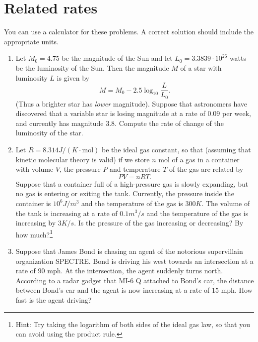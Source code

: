 \documentclass[reqno,12pt,letterpaper]{amsart}
\theoremstyle{definition}
\numberwithin{equation}{section}
\begin{document}
\section{Related rates}
You can use a calculator for these problems.
A correct solution should include the appropriate units.

\begin{enumerate}
\item Let $M_0 = 4.75$ be the magnitude of the Sun and let $L_0 = 3.3839 \cdot 10^{26}$ watts be the luminosity of the Sun.
Then the magnitude $M$ of a star with luminosity $L$ is given by
$$M = M_0 - 2.5 \log_{10} \frac{L}{L_0}.$$
(Thus a brighter star has \emph{lower} magnitude).
Suppose that astronomers have discovered that a variable star is losing magnitude at a rate of $0.09$ per week, and currently has magnitude $3.8$.
Compute the rate of change of the luminosity of the star.
\item Let $R = 8.314 J/(K\cdot \text{mol})$ be the ideal gas constant, so that (assuming that kinetic molecular theory is valid) if we store $n$ mol of a gas in a container with volume $V$, the pressure $P$ and temperature $T$ of the gas are related by
$$PV = nRT.$$
Suppose that a container full of a high-pressure gas is slowly expanding, but no gas is entering or exiting the tank.
Currently, the pressure inside the container is $10^6 J/m^3$ and the temperature of the gas is $300 K$.
The volume of the tank is increasing at a rate of $0.1 m^3/s$ and the temperature of the gas is increasing by $3 K/s$.
Is the pressure of the gas increasing or decreasing? By how much?\footnote{Hint: Try taking the logarithm of both sides of the ideal gas law, so that you can avoid using the product rule.}
\item Suppose that James Bond is chasing an agent of the notorious supervillain organization SPECTRE.
Bond is driving his west towards an intersection at a rate of $90$ mph.
At the intersection, the agent suddenly turns north.
According to a radar gadget that MI-6 Q attached to Bond's car, the distance between Bond's car and the agent is now increasing at a rate of $15$ mph.
How fast is the agent driving?
\end{enumerate}

\printbibliography
\end{document}
